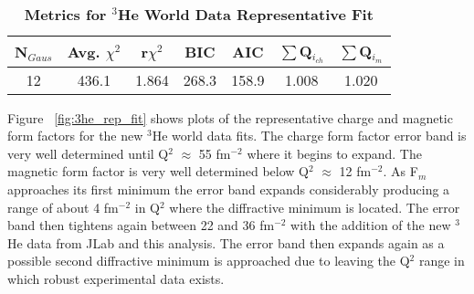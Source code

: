 
\begin{table}[!h]
\centering
\begin{tabular}{|c c c c c c c|}
\hline
\textbf{N$_{Gaus}$} & \textbf{Avg. $\chi^2$} & \textbf{r$\chi^2$} & \textbf{BIC} & \textbf{AIC} & \textbf{$\sum$Q$_{i_{ch}}$} & \textbf{$\sum$Q$_{i_{m}}$}\\
\hline
12 & 436.1 & 1.864 & 268.3 & 158.9 & 1.008 & 1.020\\
\hline
\end{tabular}
\caption{\bf{Metrics for $^3$He World Data Representative Fit}}
\label{tab:3he_rep_fit_stats}
\end{table}

Figure ~\ref{fig:3he_rep_fit} shows plots of the representative charge and magnetic form factors for the new $^3$He world data fits. The charge form factor error band is very well determined until Q$^2$ $\approx$ 55 fm$^{-2}$ where it begins to expand. The magnetic form factor is very well determined below  Q$^2$ $\approx$ 12 fm$^{-2}$. As F$_m$ approaches its first minimum the error band expands considerably producing a range of about 4 fm$^{-2}$ in Q$^2$ where the diffractive minimum is located. The error band then tightens again between 22 and 36 fm$^{-2}$ with the addition of the new $^3$He data from JLab and this analysis. The error band then expands again as a possible second diffractive minimum is approached due to leaving the Q$^2$ range in which robust experimental data exists. 


